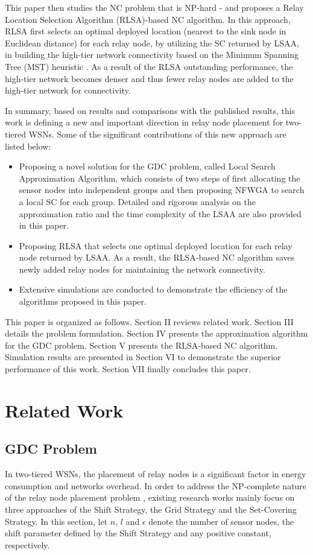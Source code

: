 \documentclass[journal]{IEEEtran}
\begin{document}
This paper then studies the NC problem that is NP-hard \cite{Lin99}-\cite{Dandekar12} and proposes a Relay Location Selection Algorithm (RLSA)-based NC algorithm. In this approach, RLSA first selects an optimal deployed location (nearest to the sink node in Euclidean distance) for each relay node, by utilizing the SC returned by LSAA, in building the high-tier network connectivity based on the Minimum Spanning Tree (MST) heuristic \cite{Lloyd07}. As a result of the RLSA outstanding performance, the high-tier network becomes denser and thus fewer relay nodes are added to the high-tier network for connectivity.

In summary, based on results and comparisons with the published results, this work is defining a new and important direction in relay node placement for two-tiered WSNs. Some of the significant contributions of this new approach are listed below:

\begin{itemize}
  \item Proposing a novel solution for the GDC problem, called Local Search Approximation Algorithm, which consists of two steps of first allocating the sensor nodes into independent groups and then proposing NFWGA to search a local SC for each group. Detailed and rigorous analysis on the approximation ratio and the time complexity of the LSAA are also provided in this paper.
  \item Proposing RLSA that selects one optimal deployed location for each relay node returned by LSAA. As a result, the RLSA-based NC algorithm saves newly added relay nodes for maintaining the network connectivity.
  \item Extensive simulations are conducted to demonstrate the efficiency of the algorithms proposed in this paper.
\end{itemize}

This paper is organized as follows. Section II reviews related work. Section III details the problem formulation. Section IV presents the approximation algorithm for the GDC problem. Section V presents the RLSA-based NC algorithm. Simulation results are presented in Section VI to demonstrate the superior performance of this work. Section VII finally concludes this paper.

\section{Related Work}
\subsection{GDC Problem}
In two-tiered WSNs, the placement of relay nodes is a significant factor in energy consumption and networks overhead. In order
to address the NP-complete nature of the relay node placement problem \cite{Fowler81}, existing research works mainly focus on three approaches of the Shift Strategy, the Grid Strategy and the Set-Covering Strategy. In this section, let $n$, $l$ and $\epsilon$ denote the number of sensor nodes, the shift parameter defined by the Shift Strategy and any positive constant, respectively.
\end{document}
